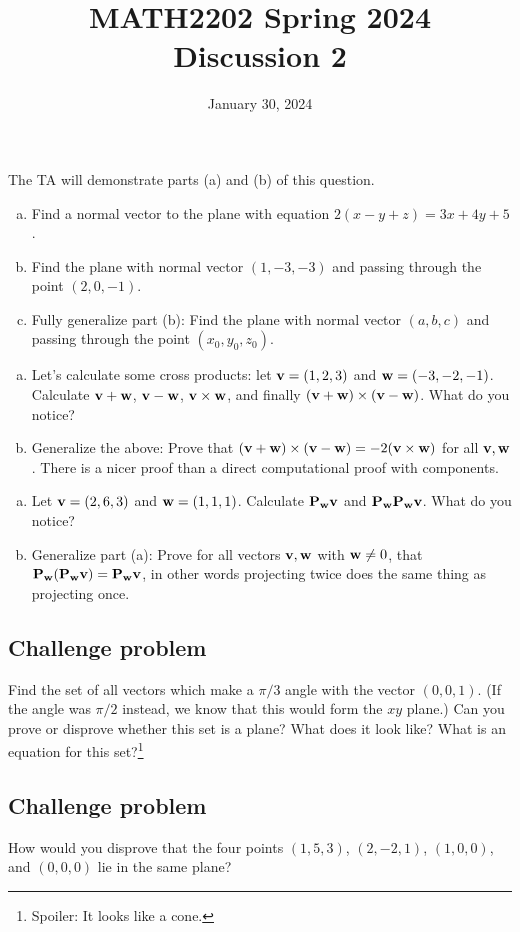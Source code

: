 \documentclass[11pt,oneside]{amsart}
\title{MATH2202 Spring 2024\\
Discussion 2}
\date{January 30, 2024}
\theoremstyle{definition}
\begin{document}
  \maketitle

  \begin{problem}
    The TA will demonstrate parts (a) and (b) of this question.
    \begin{enumerate}[(a)]
        \item Find a normal vector to the plane with equation $2(x-y+z)=3x+4y+5$.
        \item Find the plane with normal vector $(1,-3,-3)$ and passing through the point $(2,0,-1)$.
        \item Fully generalize part (b): Find the plane with normal vector $(a,b,c)$ and passing through the point $(x_0,y_0,z_0)$.
    \end{enumerate}
  \end{problem}

  \begin{problem}
      \leavevmode\begin{enumerate}[(a)]
          \item Let's calculate some cross products: let $\mathbf v=(1,2,3)$ and $\mathbf w=(-3,-2,-1)$. Calculate $\mathbf v+\mathbf w$, $\mathbf v-\mathbf w$, $\mathbf v\times\mathbf w$, and finally $(\mathbf v+\mathbf w)\times(\mathbf v-\mathbf w)$. What do you notice?
          \item Generalize the above: Prove that $(\mathbf v+\mathbf w)\times(\mathbf v-\mathbf w)=-2(\mathbf v\times\mathbf w)$ for all $\mathbf v,\mathbf w$. There is a nicer proof than a direct computational proof with components.
      \end{enumerate}
  \end{problem}

  \begin{problem}
    \leavevmode\begin{enumerate}[(a)]
        \item Let $\mathbf v=(2,6,3)$ and $\mathbf w=(1,1,1)$. Calculate $\mathbf P_\mathbf w \mathbf v$ and $\mathbf P_\mathbf w \mathbf P_\mathbf w \mathbf v$. What do you notice?
        \item Generalize part (a): Prove for all vectors $\mathbf v,\mathbf w$ with $\mathbf w\neq 0$, that $\mathbf P_\mathbf w(\mathbf P_\mathbf w \mathbf v)=\mathbf P_\mathbf w \mathbf v$, in other words projecting twice does the same thing as projecting once.
    \end{enumerate}
  \end{problem}

\subsection*{Challenge problem}
Find the set of all vectors which make a $\pi/3$ angle with the vector $(0,0,1)$. (If the angle was $\pi/2$ instead, we know that this would form the $xy$ plane.) Can you prove or disprove whether this set is a plane? What does it look like? What is an equation for this set?\footnote{Spoiler: It looks like a cone.}

\subsection*{Challenge problem}
How would you disprove that the four points $(1,5,3)$, $(2,-2,1)$, $(1,0,0)$, and $(0,0,0)$ lie in the same plane?
\end{document}
